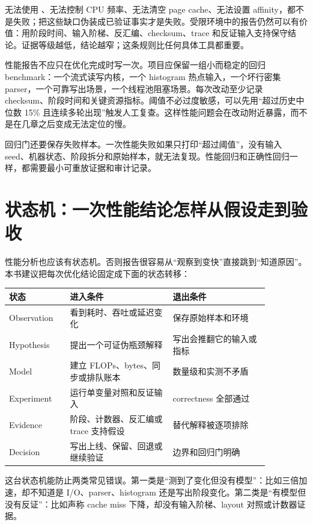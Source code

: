 无法使用 、无法控制 CPU 频率、无法清空 page cache、无法设置 affinity，都不是失败；把这些缺口伪装成已验证事实才是失败。受限环境中的报告仍然可以有价值：用阶段时间、输入阶梯、反汇编、checksum、trace 和反证输入支持保守结论。证据等级越低，结论越窄；这条规则比任何具体工具都重要。

性能报告不应只在优化完成时写一次。项目应保留一组小而稳定的回归 benchmark：一个流式读写内核，一个 histogram 热点输入，一个坏行密集 parser，一个可靠写出场景，一个线程池阻塞场景。每次改动至少记录 checksum、阶段时间和关键资源指标。阈值不必过度敏感，可以先用“超过历史中位数 15\% 且连续多轮出现”触发人工复查。这样性能问题会在改动附近暴露，而不是在几章之后变成无法定位的慢。

回归门还要保存失败样本。一次性能失败如果只打印“超过阈值”，没有输入 seed、机器状态、阶段拆分和原始样本，就无法复现。性能回归和正确性回归一样，都需要最小可重放证据和审计记录。

\section{状态机：一次性能结论怎样从假设走到验收}

性能分析也应该有状态机。否则报告很容易从“观察到变快”直接跳到“知道原因”。本书建议把每次优化结论固定成下面的状态转移：

\begin{center}
\begin{tabular}{p{0.20\linewidth}p{0.34\linewidth}p{0.32\linewidth}}
\toprule
状态 & 进入条件 & 退出条件 \\
\midrule
Observation & 看到耗时、吞吐或延迟变化 & 保存原始样本和环境 \\
Hypothesis & 提出一个可证伪瓶颈解释 & 写出会推翻它的输入或指标 \\
Model & 建立 FLOPs、bytes、同步或排队账本 & 数量级和实测不矛盾 \\
Experiment & 运行单变量对照和反证输入 & correctness 全部通过 \\
Evidence & 阶段、计数器、反汇编或 trace 支持假设 & 替代解释被逐项排除 \\
Decision & 写出上线、保留、回退或继续验证 & 边界和回归门明确 \\
\bottomrule
\end{tabular}
\end{center}

这台状态机能防止两类常见错误。第一类是“测到了变化但没有模型”：比如三倍加速，却不知道是 I/O、parser、histogram 还是写出阶段变化。第二类是“有模型但没有反证”：比如声称 cache miss 下降，却没有输入阶梯、layout 对照或计数器证据。

